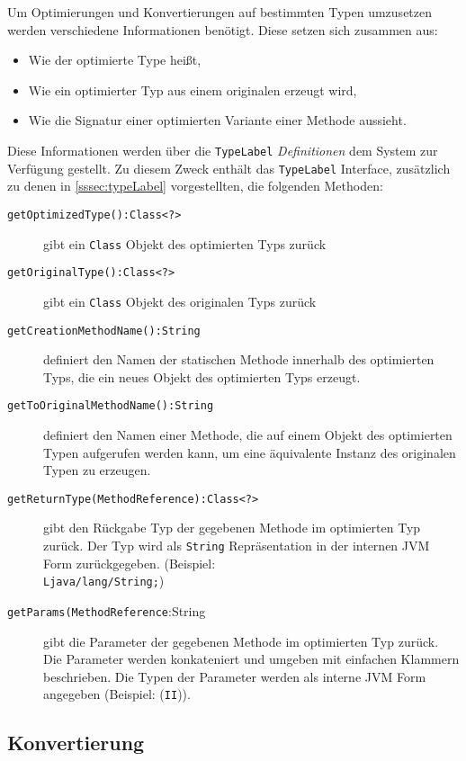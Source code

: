 Um Optimierungen und Konvertierungen auf bestimmten Typen umzusetzen werden verschiedene 
Informationen benötigt. Diese setzen sich zusammen aus:

\begin{itemize}
	\item Wie der optimierte Type heißt,
	\item Wie ein optimierter Typ aus einem originalen erzeugt wird,
	\item Wie die Signatur einer optimierten Variante einer Methode aussieht.
\end{itemize} 


Diese Informationen werden über die \texttt{TypeLabel} \textit{Definitionen} dem System zur Verfügung gestellt.
Zu diesem Zweck enthält das \texttt{TypeLabel} Interface, zusätzlich zu denen in \ref{sssec:typeLabel} 
vorgestellten, die folgenden Methoden: 

\begin{description}
	\item[\texttt{getOptimizedType():Class<?>}] gibt ein \texttt{Class} Objekt des optimierten Typs zurück
	\item[\texttt{getOriginalType():Class<?>}] gibt ein \texttt{Class} Objekt des originalen Typs zurück
	\item[\texttt{getCreationMethodName():String}] definiert den Namen der statischen Methode innerhalb des
	optimierten Typs, die ein neues Objekt des optimierten Typs erzeugt.
	\item[\texttt{getToOriginalMethodName():String}] definiert den Namen einer Methode, die auf einem Objekt
	des optimierten Typen aufgerufen werden kann, um eine äquivalente Instanz des originalen Typen
	zu erzeugen.
	\item[\texttt{getReturnType(MethodReference):Class<?>}] gibt den Rückgabe Typ der gegebenen 
	Methode im optimierten Typ zurück. Der Typ wird als \texttt{String} 
	Repräsentation in der internen JVM Form zurückgegeben.
	(Beispiel: \\\texttt{Ljava/lang/String;})
	\item[\texttt{getParams(MethodReference}:String] gibt die Parameter der gegebenen Methode im optimierten
	Typ zurück. Die Parameter werden konkateniert und umgeben mit einfachen Klammern 
	beschrieben. Die Typen der Parameter werden als interne JVM Form angegeben (Beispiel: (\texttt{II})).
\end{description}

\subsection{Konvertierung}

